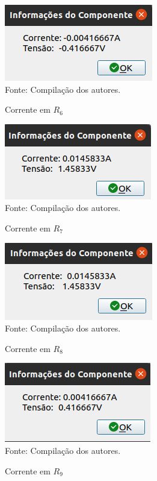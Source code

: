 \documentclass[twocolumn, 10pt,a4paper]{extarticle}
\begin{document}
\begin{figure}[H]
	\caption{Corrente em $R_6$} 
	\centering
	\includegraphics[scale=0.7]{ir6}
	\\ Fonte: Compilação dos autores.
\end{figure}

\begin{figure}[H]
	\caption{Corrente em $R_7$} 
	\centering
	\includegraphics[scale=0.7]{ir7}
	\\ Fonte: Compilação dos autores.
\end{figure}

\begin{figure}[H]
	\caption{Corrente em $R_8$} 
	\centering
	\includegraphics[scale=0.7]{ir8}
	\\ Fonte: Compilação dos autores.
\end{figure}

\begin{figure}[H]
	\caption{Corrente em $R_9$} 
	\centering
	\includegraphics[scale=0.7]{ir9}
	\\ Fonte: Compilação dos autores.
\end{figure}
\end{document}
